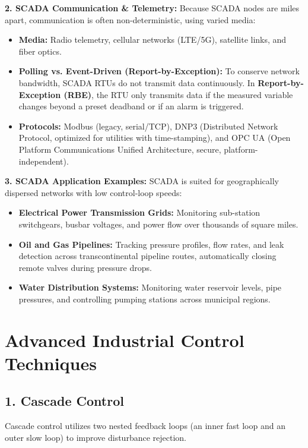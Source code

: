 \documentclass[12pt,a4paper]{article}
\begin{document}
\textbf{2. SCADA Communication \& Telemetry:}
Because SCADA nodes are miles apart, communication is often non-deterministic, using varied media:
\begin{itemize}[leftmargin=*, itemsep=2.5pt]
  \item \textbf{Media:} Radio telemetry, cellular networks (LTE/5G), satellite links, and fiber optics.
  \item \textbf{Polling vs. Event-Driven (Report-by-Exception):} To conserve network bandwidth, SCADA RTUs do not transmit data continuously. In \textbf{Report-by-Exception (RBE)}, the RTU only transmits data if the measured variable changes beyond a preset deadband or if an alarm is triggered.
  \item \textbf{Protocols:} Modbus (legacy, serial/TCP), DNP3 (Distributed Network Protocol, optimized for utilities with time-stamping), and OPC UA (Open Platform Communications Unified Architecture, secure, platform-independent).
\end{itemize}

\textbf{3. SCADA Application Examples:}
SCADA is suited for geographically dispersed networks with low control-loop speeds:
\begin{itemize}[leftmargin=*, itemsep=2pt]
  \item \textbf{Electrical Power Transmission Grids:} Monitoring sub-station switchgears, busbar voltages, and power flow over thousands of square miles.
  \item \textbf{Oil and Gas Pipelines:} Tracking pressure profiles, flow rates, and leak detection across transcontinental pipeline routes, automatically closing remote valves during pressure drops.
  \item \textbf{Water Distribution Systems:} Monitoring water reservoir levels, pipe pressures, and controlling pumping stations across municipal regions.
\end{itemize}


\section{Advanced Industrial Control Techniques}

\subsection{1. Cascade Control}
Cascade control utilizes two nested feedback loops (an inner fast loop and an outer slow loop) to improve disturbance rejection.
\end{document}
